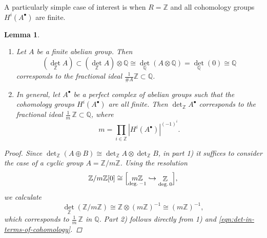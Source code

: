 \documentclass[10pt,a4paper,oneside,draft]{article}
\newcommand{\QQ}{\mathbb{Q}}
\newcommand{\ZZ}{\mathbb{Z}}
\renewcommand{\det}{\operatorname{det}}
\theoremstyle{myplain}
\newtheorem{lemma}[theorem]{Lemma}
\theoremstyle{mydefinition}
\numberwithin{equation}{section}
\begin{document}
\begin{appendices}
A particularly simple case of interest is when $R = \ZZ$ and all cohomology
groups $H^i (A^\bullet)$ are finite.

\begin{lemma}
  \label{lemma:determinant-for-torsion-cohomology}
  ~

  \begin{enumerate}
  \item[1)] Let $A$ be a finite abelian group. Then
    \[ (\det_\ZZ A) \subset (\det_\ZZ A) \otimes \QQ
      \cong \det_\QQ (A \otimes \QQ) = \det_\QQ (0) \cong \QQ \]
    corresponds to the fractional ideal $\frac{1}{\# A} \ZZ \subset \QQ$.

  \item[2)] In general, let $A^\bullet$ be a perfect complex of abelian groups
    such that the cohomology groups $H^i (A^\bullet)$ are all finite. Then
    $\det_\ZZ A^\bullet$ corresponds to the fractional ideal
    $\frac{1}{m}\,\ZZ \subset \QQ$, where
    $$m = \prod_{i\in \ZZ} |H^i (A^\bullet)|^{(-1)^i}.$$
  \end{enumerate}

  \begin{proof}
    Since $\det_\ZZ (A\oplus B) \cong \det_\ZZ A \otimes \det_\ZZ B$, in
    part 1) it suffices to consider the case of a cyclic group
    $A = \ZZ/m\ZZ$. Using the resolution
    \[ \ZZ/m\ZZ [0] \cong \Bigl[
      \mathop{m\ZZ}_{\text{deg.\,}-1} \hookrightarrow
      \mathop{\ZZ}_{\text{deg.\,}0}
      \Bigr], \]
    we calculate
    $$\det_\ZZ (\ZZ/m\ZZ) \cong \ZZ \otimes (m\ZZ)^{-1} \cong (m\ZZ)^{-1},$$
    which corresponds to $\frac{1}{m}\,\ZZ$ in $\QQ$.
    Part 2) follows directly from 1) and \eqref{eqn:det-in-terms-of-cohomology}.
  \end{proof}
\end{lemma}

\end{appendices}




\end{document}
